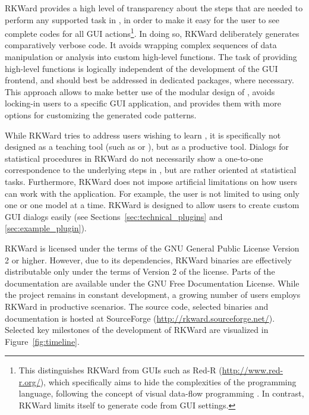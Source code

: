RKWard provides a high level of transparency about the steps that are needed to
perform any supported task in , in order to make it easy for the user to see
complete codes for all GUI actions\footnote{
  This distinguishes RKWard from  GUIs such as Red-R (\url{http://www.red-r.org/}), which 
  specifically aims to hide the complexities of the  programming language, following the concept of visual data-flow 
  programming \citep{Sutherland1966}. In contrast, RKWard limits itself to generate  code from GUI settings.
}. In doing so, RKWard deliberately generates
comparatively verbose code. It avoids wrapping complex sequences of data
manipulation or analysis into custom high-level  functions. The task of
providing high-level functions is logically independent of the development of the
GUI frontend, and should best be addressed in dedicated  packages, where necessary.
This approach allows to make better use of the modular design of , avoids
locking-in users to a specific GUI application, and provides them with more options for
customizing the generated code patterns.

While RKWard tries to address users wishing to learn , it is specifically not
designed as a teaching tool (such as  or ), but as
a productive tool. Dialogs for statistical procedures in RKWard do not
necessarily show a one-to-one correspondence to the underlying steps in , but are
rather oriented at statistical tasks. Furthermore, RKWard does not impose
artificial limitations on how users can work with the application. For example,
the user is not limited to using only one  or one model at a
time. RKWard is designed to allow users to create custom GUI dialogs
easily (see Sections~\ref{sec:technical_plugins} and \ref{sec:example_plugin}).

RKWard is licensed under the terms of the GNU General Public License Version 2
or higher. However, due to its dependencies, RKWard binaries are effectively
distributable only under the terms of Version 2 of the license. Parts of the documentation are available under the
GNU Free Documentation License. While the project remains in constant development, a growing
number of users employs RKWard in productive scenarios. The source code,
selected binaries and documentation is hosted at SourceForge
(\url{http://rkward.sourceforge.net/}). Selected key milestones of the development of RKWard are
visualized in Figure~\ref{fig:timeline}.

